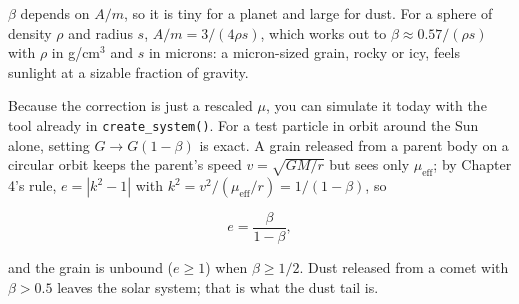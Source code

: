 \documentclass[
  10.5pt,
  letterpaper,
]{scrbook}
\theoremstyle{plain}
\theoremstyle{remark}
\begin{document}
\(\beta\) depends on \(A/m\), so it is tiny for a planet and large for
dust. For a sphere of density \(\rho\) and radius \(s\),
\(A/m = 3/(4\rho s)\), which works out to
\(\beta \approx 0.57/(\rho s)\) with \(\rho\) in g/cm\(^3\) and \(s\) in
microns: a micron-sized grain, rocky or icy, feels sunlight at a sizable
fraction of gravity.

Because the correction is just a rescaled \(\mu\), you can simulate it
today with the tool already in \texttt{create\_system()}. For a test
particle in orbit around the Sun alone, setting \(G \to G(1-\beta)\) is
exact. A grain released from a parent body on a circular orbit keeps the
parent's speed \(v = \sqrt{GM/r}\) but sees only \(\mu_{\mathrm{eff}}\);
by Chapter 4's rule, \(e = |k^2 - 1|\) with
\(k^2 = v^2/(\mu_{\mathrm{eff}}/r) = 1/(1-\beta)\), so

\[
e = \frac{\beta}{1-\beta},
\]

and the grain is unbound (\(e \ge 1\)) when \(\beta \ge 1/2\). Dust
released from a comet with \(\beta > 0.5\) leaves the solar system; that
is what the dust tail is.
\end{document}
